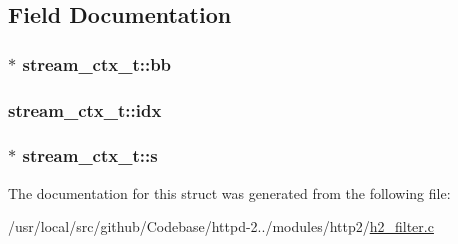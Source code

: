 \subsection{Field Documentation}
\subsubsection[{\texorpdfstring{bb}{bb}}]{$\ast$ stream\+\_\+ctx\+\_\+t\+::bb}\hypertarget{structstream__ctx__t_a5813a0c8e9aada26dd87deb749fec2e8}{}\label{structstream__ctx__t_a5813a0c8e9aada26dd87deb749fec2e8}
\subsubsection[{\texorpdfstring{idx}{idx}}]{ stream\+\_\+ctx\+\_\+t\+::idx}\hypertarget{structstream__ctx__t_a3c189b2f82c8ace9f9b0b73e0fe0b1a2}{}\label{structstream__ctx__t_a3c189b2f82c8ace9f9b0b73e0fe0b1a2}
\subsubsection[{\texorpdfstring{s}{s}}]{$\ast$ stream\+\_\+ctx\+\_\+t\+::s}\hypertarget{structstream__ctx__t_a70d283402cc0db693505ea1fcab4ee78}{}\label{structstream__ctx__t_a70d283402cc0db693505ea1fcab4ee78}


The documentation for this struct was generated from the following file\+:\begin{DoxyCompactItemize}
\item 
/usr/local/src/github/\+Codebase/httpd-\/2../modules/http2/\hyperlink{h2__filter_8c}{h2\+\_\+filter.\+c}\end{DoxyCompactItemize}
